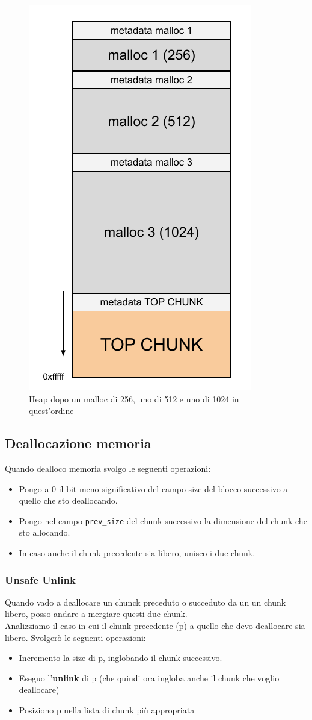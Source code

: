 \documentclass[a4paper,12pt]{article}
\begin{document}
\begin{figure}[H]
	\centering
	\includegraphics[width=0.4\linewidth]{Immagini/Heap2}
	\caption{Heap dopo un malloc di 256, uno di 512 e uno di 1024 in quest'ordine}
\end{figure}

\subsection{Deallocazione memoria}
Quando dealloco memoria svolgo le seguenti operazioni:
\begin{itemize}
\item Pongo a 0 il bit meno significativo del campo size del blocco successivo a quello che sto deallocando.
\item Pongo nel campo \texttt{prev\_size} del chunk successivo la dimensione del chunk che sto allocando.
\item In caso anche il chunk precedente sia libero, unisco i due chunk.
\end{itemize}
\subsubsection{Unsafe Unlink}
Quando vado a deallocare un chunck preceduto o succeduto da un un chunk libero, posso andare a mergiare questi due chunk.\\
Analizziamo il caso in cui il chunk precedente (p) a quello che devo deallocare sia libero. Svolgerò le seguenti operazioni:
\begin{itemize}
\item Incremento la size di p, inglobando il chunk successivo.
\item Eseguo l'\textbf{unlink} di p (che quindi ora ingloba anche il chunk che voglio deallocare)
\item Posiziono p nella lista di chunk più appropriata
\end{itemize}
\end{document}
